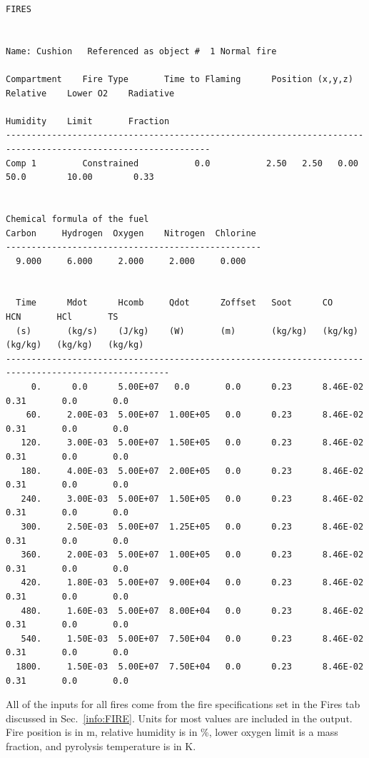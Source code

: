 \begin{lstlisting}[basicstyle=\tiny]
FIRES


Name: Cushion   Referenced as object #  1 Normal fire

Compartment    Fire Type       Time to Flaming      Position (x,y,z)     Relative    Lower O2    Radiative
                                                                         Humidity    Limit       Fraction
--------------------------------------------------------------------------------------------------------------
Comp 1         Constrained           0.0           2.50   2.50   0.00     50.0        10.00        0.33


Chemical formula of the fuel
Carbon     Hydrogen  Oxygen    Nitrogen  Chlorine
--------------------------------------------------
  9.000     6.000     2.000     2.000     0.000


  Time      Mdot      Hcomb     Qdot      Zoffset   Soot      CO        HCN       HCl       TS
  (s)       (kg/s)    (J/kg)    (W)       (m)       (kg/kg)   (kg/kg)   (kg/kg)   (kg/kg)   (kg/kg)
------------------------------------------------------------------------------------------------------
     0.      0.0      5.00E+07   0.0       0.0      0.23      8.46E-02  0.31       0.0       0.0
    60.     2.00E-03  5.00E+07  1.00E+05   0.0      0.23      8.46E-02  0.31       0.0       0.0
   120.     3.00E-03  5.00E+07  1.50E+05   0.0      0.23      8.46E-02  0.31       0.0       0.0
   180.     4.00E-03  5.00E+07  2.00E+05   0.0      0.23      8.46E-02  0.31       0.0       0.0
   240.     3.00E-03  5.00E+07  1.50E+05   0.0      0.23      8.46E-02  0.31       0.0       0.0
   300.     2.50E-03  5.00E+07  1.25E+05   0.0      0.23      8.46E-02  0.31       0.0       0.0
   360.     2.00E-03  5.00E+07  1.00E+05   0.0      0.23      8.46E-02  0.31       0.0       0.0
   420.     1.80E-03  5.00E+07  9.00E+04   0.0      0.23      8.46E-02  0.31       0.0       0.0
   480.     1.60E-03  5.00E+07  8.00E+04   0.0      0.23      8.46E-02  0.31       0.0       0.0
   540.     1.50E-03  5.00E+07  7.50E+04   0.0      0.23      8.46E-02  0.31       0.0       0.0
  1800.     1.50E-03  5.00E+07  7.50E+04   0.0      0.23      8.46E-02  0.31       0.0       0.0
\end{lstlisting}
All of the inputs for all fires come from the fire specifications set in the Fires tab discussed in Sec.~\ref{info:FIRE}.  Units for most values are included in the output.  Fire position is in m, relative humidity is in \%, lower oxygen limit is a mass fraction, and pyrolysis temperature is in K.


